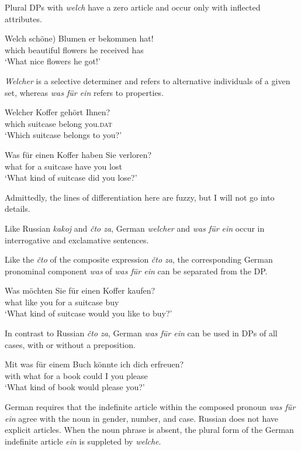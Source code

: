 \documentclass[output=paper,colorlinks,citecolor=brown]{langscibook}
\begin{document}
\noindent Plural DPs with \textit{welch} have a zero article and occur only with inflected attributes.

\ea \label{ex:zi08:18}
    \gll Welch \minsp{*(} schöne) Blumen er bekommen hat!\\
    which {} beautiful flowers he received has\\
    \glt `What nice flowers he got!'
\z

\noindent \textit{Welcher} is a selective determiner and refers to alternative individuals of a given set, whereas \textit{was für ein} refers to properties.

\ea \label{ex:zi08:19}
    \gll Welcher Koffer gehört Ihnen?\\
    which suitcase belong you.\textsc{dat}\\
    \glt `Which suitcase belongs to you?'
\z

\ea \label{ex:zi08:20}
    \gll Was für einen Koffer haben Sie verloren?\\
    what for a suitcase have you lost\\
    \glt `What kind of suitcase did you lose?'
\z

\noindent Admittedly, the lines of differentiation here are fuzzy, but I will not go into details.

Like Russian \textit{kakoj} and \textit{čto za}, German \textit{welcher} and \textit{was für ein} occur in interrogative and exclamative sentences.

Like the \textit{čto} of the composite expression \textit{čto za}, the corresponding German pronominal component \textit{was} of \textit{was für ein} can be separated from the DP.

\ea \label{ex:zi08:21}
    \gll Was möchten Sie für einen Koffer kaufen?\\
    what like you for a suitcase buy\\
    \glt `What kind of suitcase would you like to buy?'
\z

\noindent In contrast to Russian \textit{čto za}, German \textit{was für ein} can be used in DPs of all cases, with or without a preposition.

\ea \label{ex:zi08:22}
    \gll Mit was für einem Buch könnte ich dich erfreuen?\\
    with what for a book could I you please\\
    \glt `What kind of book would please you?'
\z

\noindent German requires that the indefinite article within the composed pronoun \textit{was für ein} agree with the noun in gender, number, and case. Russian does not have explicit articles. When the noun phrase is absent, the plural form of the German indefinite article \textit{ein} is suppleted by \textit{welche}.
\end{document}
